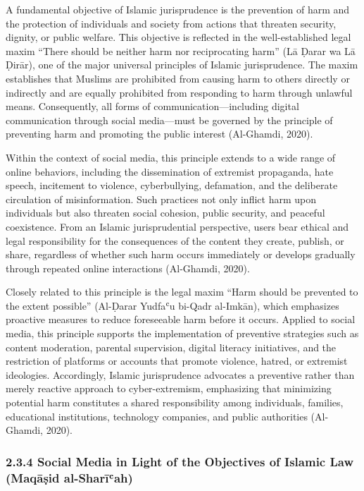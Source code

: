 \documentclass[10pt]{NSP1}
\begin{document}
\par\medskip{}\smallskip

A fundamental objective of Islamic jurisprudence is the prevention of harm and the protection of individuals and society from actions that threaten security, dignity, or public welfare. This objective is reflected in the well-established legal maxim “There should be neither harm nor reciprocating harm” (Lā Ḍarar wa Lā Ḍirār), one of the major universal principles of Islamic jurisprudence. The maxim establishes that Muslims are prohibited from causing harm to others directly or indirectly and are equally prohibited from responding to harm through unlawful means. Consequently, all forms of communication—including digital communication through social media—must be governed by the principle of preventing harm and promoting the public interest (Al-Ghamdi, 2020).

Within the context of social media, this principle extends to a wide range of online behaviors, including the dissemination of extremist propaganda, hate speech, incitement to violence, cyberbullying, defamation, and the deliberate circulation of misinformation. Such practices not only inflict harm upon individuals but also threaten social cohesion, public security, and peaceful coexistence. From an Islamic jurisprudential perspective, users bear ethical and legal responsibility for the consequences of the content they create, publish, or share, regardless of whether such harm occurs immediately or develops gradually through repeated online interactions (Al-Ghamdi, 2020).

Closely related to this principle is the legal maxim “Harm should be prevented to the extent possible” (Al-Ḍarar Yudfaʿu bi-Qadr al-Imkān), which emphasizes proactive measures to reduce foreseeable harm before it occurs. Applied to social media, this principle supports the implementation of preventive strategies such as content moderation, parental supervision, digital literacy initiatives, and the restriction of platforms or accounts that promote violence, hatred, or extremist ideologies. Accordingly, Islamic jurisprudence advocates a preventive rather than merely reactive approach to cyber-extremism, emphasizing that minimizing potential harm constitutes a shared responsibility among individuals, families, educational institutions, technology companies, and public authorities (Al-Ghamdi, 2020).

\subsubsection*{2.3.4 Social Media in Light of the Objectives of Islamic Law (Maqāṣid al-Sharīʿah)}
\end{document}
